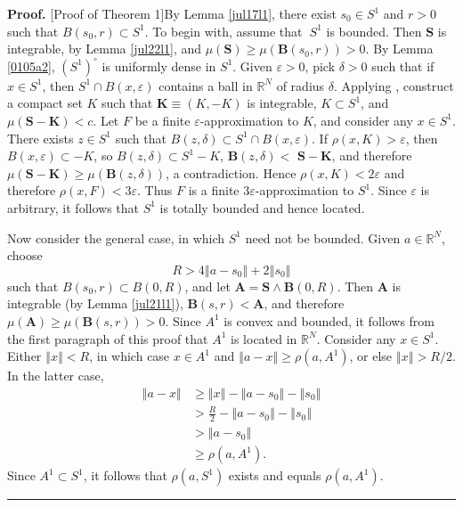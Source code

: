 \documentclass[11pt]{article}%
\newenvironment{proof}[1][Proof]{\noindent\textbf{#1.} }{\ \rule{0.5em}{0.5em}}
\begin{document}
\begin{proof}
[Proof of Theorem 1]By Lemma \ref{jul17l1}, there exist $s_{0}\in S^{1}$ and
$r>0$ such that $B(s_{0},r)\subset S^{1}$. To begin with, assume
that\textbf{\ }$S^{1}$ is bounded. Then $\mathbf{S}$ is integrable, by Lemma
\ref{jul22l1}, and $\mu(\mathbf{S})\geqslant\mu(\mathbf{B}(s_{0},r))>0$. By
Lemma \ref{0105a2}, $\left(  S^{1}\right)  ^{\circ}$ is uniformly dense in
$S^{1}$. Given $\varepsilon>0$, pick $\delta>0$ such that if $x\in S^{1}$,
then $S^{1}\cap B(x,\varepsilon)$ contains a ball in $\mathbb{R}^{N}$ of
radius $\delta$. Applying \cite[Ch. 6, (6.7)]{BB}, construct a compact set $K$
such that $\mathbf{K}\equiv(K,-K)$ is integrable, $K\subset S^{1}$, and
$\mu(\mathbf{S}-\mathbf{K})<c$. Let $F$ be a finite $\varepsilon
$-approximation to $K$, and consider any $x\in S^{1}$. There exists $z\in
S^{1}$ such that $B(z,\delta)\subset S^{1}\cap B(x,\varepsilon)$. If
$\rho\left(  x,K\right)  >\varepsilon$, then $B(x,\varepsilon)\subset-K$, so
$B(z,\delta)\subset S^{1}-K$, $\mathbf{B}(z,\delta)<$ $\mathbf{S}-\mathbf{K}$,
and therefore $\mu\left(  \mathbf{S}-\mathbf{K}\right)  \geqslant
\mu(\mathbf{B}(z,\delta))$, a contradiction. Hence $\rho\left(  x,K\right)
<2\varepsilon$ and therefore $\rho(x,F)<3\varepsilon$. Thus $F$ is a finite
$3\varepsilon$-approximation to $S^{1}$. Since $\varepsilon$ is arbitrary, it
follows that $S^{1}$ is totally bounded and hence located.

Now consider the general case, in which $S^{1}$ need not be bounded. Given
$a\in\mathbb{R}^{N}$, choose%
\[
R>4\left\Vert a-s_{0}\right\Vert +2\left\Vert s_{0}\right\Vert
\]
such that $B(s_{0},r)\subset B(0,R)$, and let $\mathbf{A}=\mathbf{S}%
\wedge\mathbf{B}(0,R)$. Then $\mathbf{A}$ is integrable (by Lemma
\ref{jul21l1}), $\mathbf{B}(s,r)<\mathbf{A}$, and therefore $\mu
(\mathbf{A})\geqslant\mu(\mathbf{B}(s,r))>0$. Since $A^{1}$ is convex and
bounded, it follows from the first paragraph of this proof that $A^{1}$ is
located in $\mathbb{R}^{N}$. Consider any $x\in S^{1}$. Either $\left\Vert
x\right\Vert <R$, in which case $x\in A^{1}$ and $\left\Vert a-x\right\Vert
\geqslant\rho(a,A^{1})$, or else $\left\Vert x\right\Vert >R/2$. In the latter
case,%
\begin{align*}
\left\Vert a-x\right\Vert  &  \geqslant\left\Vert x\right\Vert -\left\Vert
a-s_{0}\right\Vert -\left\Vert s_{0}\right\Vert \\
&  >\frac{R}{2}-\left\Vert a-s_{0}\right\Vert -\left\Vert s_{0}\right\Vert \\
&  >\left\Vert a-s_{0}\right\Vert \\
&  \geqslant\rho(a,A^{1})\text{.}%
\end{align*}
Since $A^{1}\subset S^{1}$, it follows that $\rho(a,S^{1})$ exists and equals
$\rho(a,A^{1})$.
\end{proof}
\end{document}

